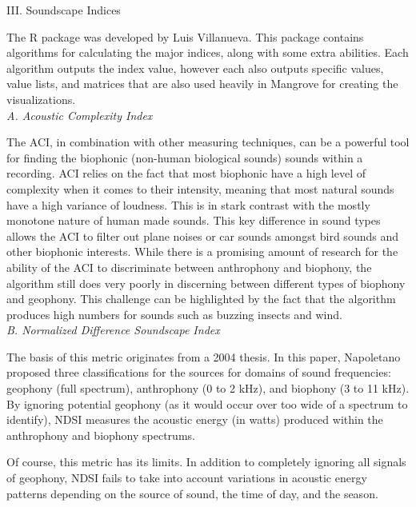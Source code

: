 \begin{center}
III. Soundscape Indices
\end{center}
\begin{flushleft}
\setlength{\parindent}{0.125in}
The  R package was developed by Luis Villanueva. This package contains algorithms for calculating the major indices, along with some extra abilities. Each algorithm outputs the index value, however each also outputs specific values, value lists, and matrices that are also used heavily in Mangrove for creating the visualizations.\\[4pt]

\noindent\textit{A. Acoustic Complexity Index}\par
The ACI, in combination with other measuring techniques, can be a powerful tool for finding the biophonic (non-human biological sounds) sounds within a recording. ACI relies on the fact that most biophonic have a high level of complexity when it comes to their intensity, meaning that most natural sounds have a high variance of loudness. This is in stark contrast with the mostly monotone nature of human made sounds. This key difference in sound types allows the ACI to filter out plane noises or car sounds amongst bird sounds and other biophonic interests. While there is a promising amount of research for the ability of the ACI to discriminate between anthrophony and biophony, the algorithm still does very poorly in discerning between different types of biophony and geophony. This challenge can be highlighted by the fact that the algorithm produces high numbers for sounds such as buzzing insects and wind.\\[4pt]

\noindent\textit{B. Normalized Difference Soundscape Index}\par
The basis of this metric originates from a 2004 thesis.\cite{napoletano} In this paper, Napoletano proposed three classifications for the sources for domains of sound frequencies: geophony (full spectrum), anthrophony (0 to 2 kHz), and biophony (3 to 11 kHz). By ignoring potential geophony (as it would occur over too wide of a spectrum to identify), NDSI measures the acoustic energy (in watts) produced within the anthrophony and biophony spectrums.\par
Of course, this metric has its limits. In addition to completely ignoring all signals of geophony, NDSI fails to take into account variations in acoustic energy patterns depending on the source of sound, the time of day, and the season.\\[4pt]


\end{flushleft}
